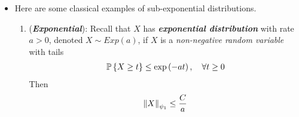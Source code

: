 \documentclass[11pt]{article}
\begin{document}
\begin{itemize}
\item \begin{example}
Here are some classical examples of sub-exponential distributions.
\begin{enumerate}
\item  (\textbf{\emph{Exponential}}): Recall that $X$ has \emph{\textbf{exponential distribution}} with rate $a > 0$, denoted $X \sim Exp(a)$, if
$X$ is a \emph{non-negative random variable} with tails
\begin{align*}
{\mathbb P}\left\{X \ge t\right\} \le \exp\left(- a t\right), \quad \forall t \ge 0
\end{align*} Then 
\begin{align}
\left\|X\right\|_{\psi_1} \le \frac{C}{a} \label{eqn: exp_sub_exp_norm}
\end{align}
\end{enumerate}
\end{example}
\end{itemize}
\end{document}
